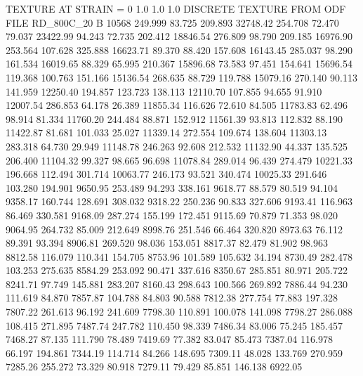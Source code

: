 TEXTURE AT STRAIN = 0
1.0   1.0   1.0
DISCRETE TEXTURE FROM ODF FILE RD_800C_20
B 10568
 249.999   83.725  209.893     32748.42
 254.708   72.470   79.037     23422.99
  94.243   72.735  202.412     18846.54
 276.809   98.790  209.185     16976.90
 253.564  107.628  325.888     16623.71
  89.370   88.420  157.608     16143.45
 285.037   98.290  161.534     16019.65
  88.329   65.995  210.367     15896.68
  73.583   97.451  154.641     15696.54
 119.368  100.763  151.166     15136.54
 268.635   88.729  119.788     15079.16
 270.140   90.113  141.959     12250.40
 194.857  123.723  138.113     12110.70
 107.855   94.655   91.910     12007.54
 286.853   64.178   26.389     11855.34
 116.626   72.610   84.505     11783.83
  62.496   98.914   81.334     11760.20
 244.484   88.871  152.912     11561.39
  93.813  112.832   88.190     11422.87
  81.681  101.033   25.027     11339.14
 272.554  109.674  138.604     11303.13
 283.318   64.730   29.949     11148.78
 246.263   92.608  212.532     11132.90
  44.337  135.525  206.400     11104.32
  99.327   98.665   96.698     11078.84
 289.014   96.439  274.479     10221.33
 196.668  112.494  301.714     10063.77
 246.173   93.521  340.474     10025.33
 291.646  103.280  194.901      9650.95
 253.489   94.293  338.161      9618.77
  88.579   80.519   94.104      9358.17
 160.744  128.691  308.032      9318.22
 250.236   90.833  327.606      9193.41
 116.963   86.469  330.581      9168.09
 287.274  155.199  172.451      9115.69
  70.879   71.353   98.020      9064.95
 264.732   85.009  212.649      8998.76
 251.546   66.464  320.820      8973.63
  76.112   89.391   93.394      8906.81
 269.520   98.036  153.051      8817.37
  82.479   81.902   98.963      8812.58
 116.079  110.341  154.705      8753.96
 101.589  105.632   34.194      8730.49
 282.478  103.253  275.635      8584.29
 253.092   90.471  337.616      8350.67
 285.851   80.971  205.722      8241.71
  97.749  145.881  283.207      8160.43
 298.643  100.566  269.892      7886.44
  94.230  111.619   84.870      7857.87
 104.788   84.803   90.588      7812.38
 277.754   77.883  197.328      7807.22
 261.613   96.192  241.609      7798.30
 110.891  100.078  141.098      7798.27
 286.088  108.415  271.895      7487.74
 247.782  110.450   98.339      7486.34
  83.006   75.245  185.457      7468.27
  87.135  111.790   78.489      7419.69
  77.382   83.047   85.473      7387.04
 116.978   66.197  194.861      7344.19
 114.714   84.266  148.695      7309.11
  48.028  133.769  270.959      7285.26
 255.272   73.329   80.918      7279.11
  79.429   85.851  146.138      6922.05
